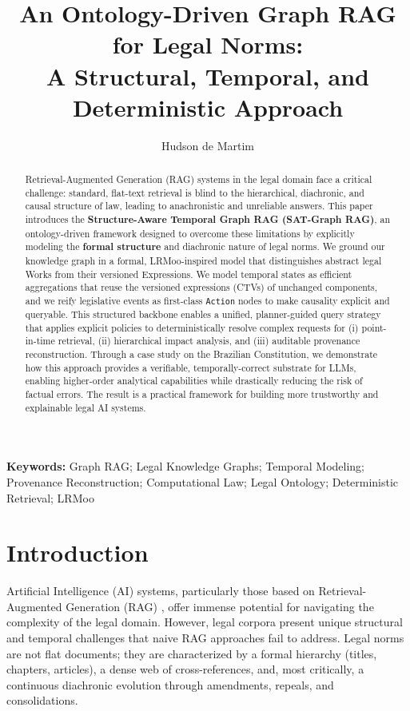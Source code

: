 \documentclass[11pt]{article}
\title{An Ontology-Driven Graph RAG for Legal Norms: \\ A Structural, Temporal, and Deterministic Approach}
\author[1]{Hudson de Martim}
\affil[1]{Federal Senate of Brazil \\ \texttt{hudsonm@senado.leg.br}}
\date{} %
\begin{document}
\maketitle

\begin{abstract}
Retrieval-Augmented Generation (RAG) systems in the legal domain face a critical challenge: standard, flat-text retrieval is blind to the hierarchical, diachronic, and causal structure of law, leading to anachronistic and unreliable answers. This paper introduces the \textbf{Structure-Aware Temporal Graph RAG (SAT-Graph RAG)}, an ontology-driven framework designed to overcome these limitations by explicitly modeling the \textbf{formal structure} and diachronic nature of legal norms. We ground our knowledge graph in a formal, LRMoo-inspired model that distinguishes abstract legal Works from their versioned Expressions. We model temporal states as efficient aggregations that reuse the versioned expressions (CTVs) of unchanged components, and we reify legislative events as first-class \texttt{Action} nodes to make causality explicit and queryable. This structured backbone enables a unified, planner-guided query strategy that applies explicit policies to deterministically resolve complex requests for (i) point-in-time retrieval, (ii) hierarchical impact analysis, and (iii) auditable provenance reconstruction. Through a case study on the Brazilian Constitution, we demonstrate how this approach provides a verifiable, temporally-correct substrate for LLMs, enabling higher-order analytical capabilities while drastically reducing the risk of factual errors. The result is a practical framework for building more trustworthy and explainable legal AI systems.
\end{abstract}

\noindent\textbf{Keywords:} Graph RAG; Legal Knowledge Graphs; Temporal Modeling; Provenance Reconstruction; Computational Law; Legal Ontology; Deterministic Retrieval; LRMoo

\section{Introduction}
Artificial Intelligence (AI) systems, particularly those based on Retrieval-Augmented Generation (RAG) \cite{lewis2020rag}, offer immense potential for navigating the complexity of the legal domain. However, legal corpora present unique structural and temporal challenges that naive RAG approaches fail to address. Legal norms are not flat documents; they are characterized by a formal hierarchy (titles, chapters, articles), a dense web of cross-references, and, most critically, a continuous diachronic evolution through amendments, repeals, and consolidations.
\end{document}
